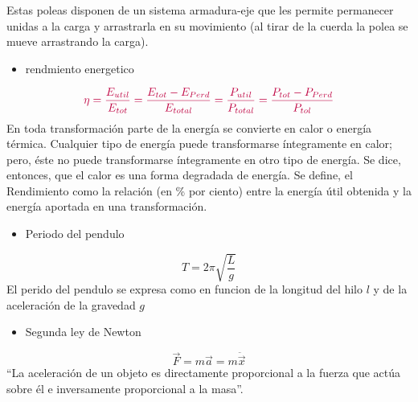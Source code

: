 \documentclass[4apaper, 12pt]{article}
\begin{document}
    Estas poleas disponen de un sistema armadura-eje que les permite permanecer unidas a la carga y arrastrarla en su movimiento (al tirar de la cuerda la polea se mueve arrastrando la carga).
    \begin{itemize}
        \item {rendmiento energetico}
    \end{itemize}
    \begin{equation}
        \textcolor{purple}{\eta=\dfrac{E_{util}}{E_{tot}}=\dfrac{E_{tot}-E_{Perd}}{E_{total}}=\dfrac{P_{util}}{P_{total}}
        =\dfrac{P_{tot}-P_{Perd}}{P_{tol}}}
    \end{equation}
    En toda transformación parte de la energía se convierte en calor o energía térmica.
    Cualquier tipo de energía puede transformarse íntegramente en calor; pero, éste no puede transformarse íntegramente en otro tipo de energía. Se dice, entonces, que el calor es una forma degradada de energía.
    Se define, el Rendimiento como la relación (en \% por ciento) entre la energía útil obtenida y la energía aportada en una transformación.
    \begin{itemize}
        \item {Periodo del pendulo}
    \end{itemize}
    \begin{equation}
        {T=2\pi\sqrt{\dfrac{L}{g}}}
    \end{equation}
    El perido del pendulo se expresa como en funcion de la longitud del hilo ${l}$ y de la aceleración de la gravedad ${g}$
    \begin{itemize}
        \item {Segunda ley de Newton}
    \end{itemize}
    \begin{equation}
    \vec{F}=m\vec{a}= m \ddot{\vec x}
    \end{equation}
    “La aceleración de un objeto es directamente proporcional a la fuerza que actúa sobre él e inversamente proporcional a la masa”.
\end{document}
